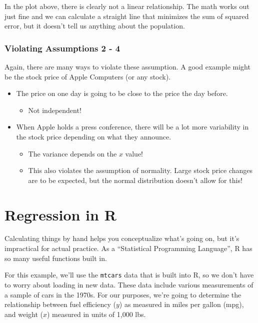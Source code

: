 \documentclass[
  letterpaper,
  DIV=11,
  numbers=noendperiod,
  oneside]{scrreprt}
\providecommand{\tightlist}{%
  \setlength{\itemsep}{0pt}\setlength{\parskip}{0pt}}\usepackage{longtable,booktabs,array}
\begin{document}
In the plot above, there is clearly not a linear relationship. The math
works out just fine and we can calculate a straight line that minimizes
the sum of squared error, but it doesn't tell us anything about the
population.

\hypertarget{violating-assumptions-2---4}{%
\subsubsection{Violating Assumptions 2 -
4}\label{violating-assumptions-2---4}}

Again, there are many ways to violate these assumption. A good example
might be the stock price of Apple Computers (or any stock).

\begin{itemize}
\tightlist
\item
  The price on one day is going to be close to the price the day before.

  \begin{itemize}
  \tightlist
  \item
    Not independent!
  \end{itemize}
\item
  When Apple holds a press conference, there will be a lot more
  variability in the stock price depending on what they announce.

  \begin{itemize}
  \tightlist
  \item
    The variance depends on the \(x\) value!
  \item
    This also violates the assumption of normality. Large stock price
    changes are to be expected, but the normal distribution doesn't
    allow for this!
  \end{itemize}
\end{itemize}

\hypertarget{regression-in-r}{%
\section{Regression in R}\label{regression-in-r}}

Calculating things by hand helps you conceptualize what's going on, but
it's impractical for actual practice. As a ``Statistical Programming
Language'', R has so many useful functions built in.

For this example, we'll use the \texttt{mtcars} data that is built into
R, so we don't have to worry about loading in new data. These data
include various measurements of a sample of cars in the 1970s. For our
purposes, we're going to determine the relationship between fuel
efficiency (\(y\)) as measured in miles per gallon (mpg), and weight
(\(x\)) measured in units of 1,000 lbs.
\end{document}
